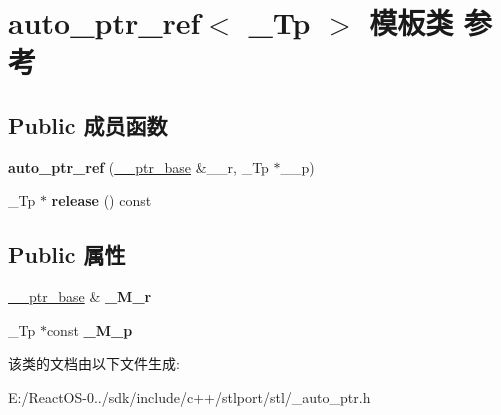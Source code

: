 \hypertarget{classauto__ptr__ref}{}\section{auto\+\_\+ptr\+\_\+ref$<$ \+\_\+\+Tp $>$ 模板类 参考}
\label{classauto__ptr__ref}
\subsection*{Public 成员函数}
\begin{DoxyCompactItemize}
\item 
\mbox{\label{classauto__ptr__ref_a28058daf04d5ab306c57d0d5169f2ac0}} 
{\bfseries auto\+\_\+ptr\+\_\+ref} (\hyperlink{class____ptr__base}{\+\_\+\+\_\+ptr\+\_\+base} \&\+\_\+\+\_\+r, \+\_\+\+Tp $\ast$\+\_\+\+\_\+p)
\item 
\mbox{\label{classauto__ptr__ref_aa399c20c8ec71fc2a72f3295dab40b45}} 
\+\_\+\+Tp $\ast$ {\bfseries release} () const
\end{DoxyCompactItemize}
\subsection*{Public 属性}
\begin{DoxyCompactItemize}
\item 
\mbox{\label{classauto__ptr__ref_a181bae629564f7dfad879670f7f64646}} 
\hyperlink{class____ptr__base}{\+\_\+\+\_\+ptr\+\_\+base} \& {\bfseries \+\_\+\+M\+\_\+r}
\item 
\mbox{\label{classauto__ptr__ref_a7f9a532abe9efdb440aeb5e9fd2351b3}} 
\+\_\+\+Tp $\ast$const {\bfseries \+\_\+\+M\+\_\+p}
\end{DoxyCompactItemize}


该类的文档由以下文件生成\+:\begin{DoxyCompactItemize}
\item 
E\+:/\+React\+O\+S-\/0../sdk/include/c++/stlport/stl/\+\_\+auto\+\_\+ptr.\+h\end{DoxyCompactItemize}
